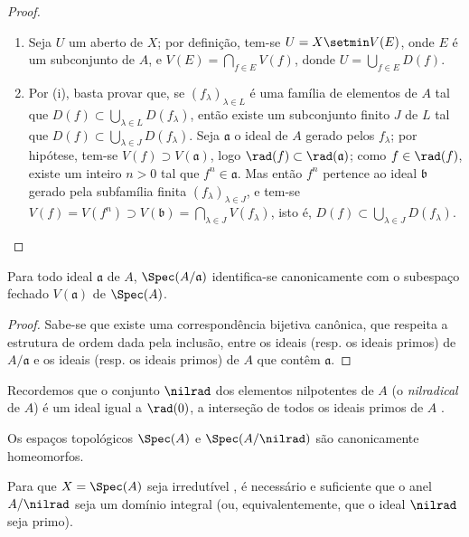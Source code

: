 \documentclass[oneside]{amsart}
\let\EGAOriginalLabel\label
\renewcommand{\label}[1]{\phantomsection\EGAOriginalLabel{#1}}
\begin{document}
\begin{proof}
\medskip\noindent
\begin{enumerate}
  \item[(i)] Seja $U$ um aberto de $X$;
    por definição, tem-se $U=X\setmin V(E)$, onde $E$ é um subconjunto de $A$, e $V(E)=\bigcap_{f\in E}V(f)$, donde $U=\bigcup_{f\in E}D(f)$.
  \item[(ii)] Por (i), basta provar que, se $(f_\lambda)_{\lambda\in L}$ é uma família de elementos de $A$ tal que $D(f)\subset\bigcup_{\lambda\in L}D(f_\lambda)$, então existe um subconjunto finito $J$ de $L$ tal que $D(f)\subset\bigcup_{\lambda\in J}D(f_\lambda)$.
    Seja $\mathfrak{a}$ o ideal de $A$ gerado pelos $f_\lambda$;
    por hipótese, tem-se $V(f)\supset V(\mathfrak{a})$, logo $\rad(f)\subset\rad(\mathfrak{a})$;
    como $f\in\rad(f)$, existe um inteiro $n>0$ tal que $f^n\in\mathfrak{a}$.
    Mas então $f^n$ pertence ao ideal $\mathfrak{b}$ gerado pela subfamília finita $(f_\lambda)_{\lambda\in J}$, e tem-se $V(f)=V(f^n)\supset V(\mathfrak{b})=\bigcap_{\lambda\in J}V(f_\lambda)$, isto é, $D(f)\subset\bigcup_{\lambda\in J}D(f_\lambda)$.
\end{enumerate}
\end{proof}

\begin{proposition}[1.1.11]
\label{I.1.1.11}
Para todo ideal $\mathfrak{a}$ de $A$, $\Spec(A/\mathfrak{a})$ identifica-se canonicamente com o subespaço fechado $V(\mathfrak{a})$ de $\Spec(A)$.
\end{proposition}

\begin{proof}
Sabe-se que existe uma correspondência bijetiva canônica, que respeita a estrutura de ordem dada pela inclusão, entre os ideais (resp. os ideais primos) de $A/\mathfrak{a}$ e os ideais (resp. os ideais primos) de $A$ que contêm $\mathfrak{a}$.
\end{proof}

Recordemos que o conjunto $\nilrad$ dos elementos nilpotentes de $A$ (o \emph{nilradical} de $A$) é um ideal igual a $\rad(0)$, a interseção de todos os ideais primos de $A$ .

\begin{corollary}[1.1.12]
\label{I.1.1.12}
Os espaços topológicos $\Spec(A)$ e $\Spec(A/\nilrad)$ são canonicamente homeomorfos.
\end{corollary}

\begin{proposition}[1.1.13]
\label{I.1.1.13}
Para que $X=\Spec(A)$ seja irredutível , é necessário e suficiente que o anel $A/\nilrad$ seja um domínio integral (ou, equivalentemente, que o ideal $\nilrad$ seja primo).
\end{proposition}
\end{document}
